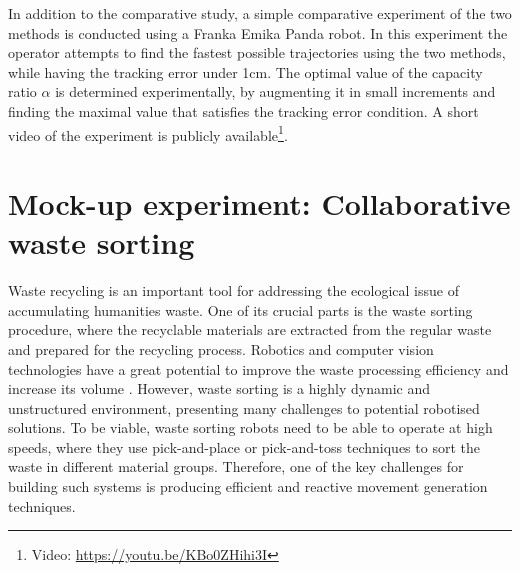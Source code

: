 
In addition to the comparative study, a simple comparative experiment of the two methods is conducted using a Franka Emika Panda robot. In this experiment the operator attempts to find the fastest possible trajectories using the two methods, while having the tracking error under 1cm. The optimal value of the capacity ratio $\alpha$ is determined experimentally, by augmenting it in small increments and finding the maximal value that satisfies the tracking error condition. A short video of the experiment is publicly available\footnote{Video: \url{https://youtu.be/KBo0ZHihi3I}}. \\







\section{Mock-up experiment: Collaborative waste sorting}
\label{ch:experiment_mockup}

Waste recycling is an important tool for addressing the ecological issue of accumulating humanities waste. One of its  crucial parts is the waste sorting procedure, where the recyclable materials are extracted from the regular waste and prepared for the recycling process. Robotics and computer vision technologies have a great potential to improve the waste processing efficiency and increase its volume \cite{Koskinopoulou2021}. 
However, waste sorting is a highly dynamic and unstructured environment, presenting many challenges to potential robotised solutions. To be viable, waste sorting robots need to be able to operate at high speeds, where they use pick-and-place or pick-and-toss \cite{Hassan2022} techniques to sort the waste in different material groups. Therefore, one of the key challenges for building such systems is producing efficient and reactive movement generation techniques. 

